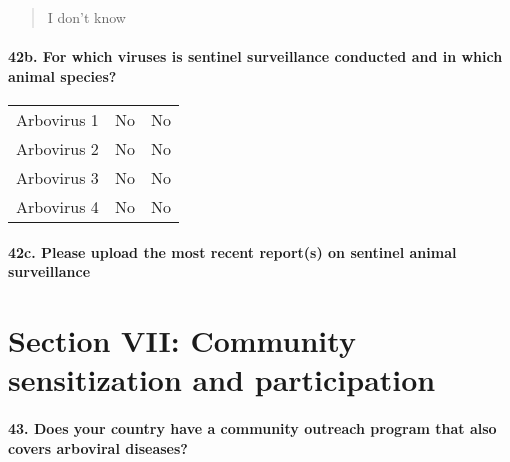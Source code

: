 \documentclass[
]{article}
\begin{document}
\begin{quote}
I don't know
\end{quote}

\hypertarget{b.-for-which-viruses-is-sentinel-surveillance-conducted-and-in-which-animal-species}{%
\paragraph{42b. For which viruses is sentinel surveillance conducted and
in which animal
species?}\label{b.-for-which-viruses-is-sentinel-surveillance-conducted-and-in-which-animal-species}}

\begin{longtable}[]{@{}lll@{}}
\toprule
\endhead
Arbovirus 1 & No & No \\
Arbovirus 2 & No & No \\
Arbovirus 3 & No & No \\
Arbovirus 4 & No & No \\
\bottomrule
\end{longtable}

\hypertarget{c.-please-upload-the-most-recent-reports-on-sentinel-animal-surveillance}{%
\paragraph{42c. Please upload the most recent report(s) on sentinel
animal
surveillance}\label{c.-please-upload-the-most-recent-reports-on-sentinel-animal-surveillance}}

\begin{quote}
\end{quote}

\hypertarget{section-vii-community-sensitization-and-participation}{%
\section{Section VII: Community sensitization and
participation}\label{section-vii-community-sensitization-and-participation}}

\hypertarget{does-your-country-have-a-community-outreach-program-that-also-covers-arboviral-diseases}{%
\paragraph{43. Does your country have a community outreach program that
also covers arboviral
diseases?}\label{does-your-country-have-a-community-outreach-program-that-also-covers-arboviral-diseases}}
\end{document}
